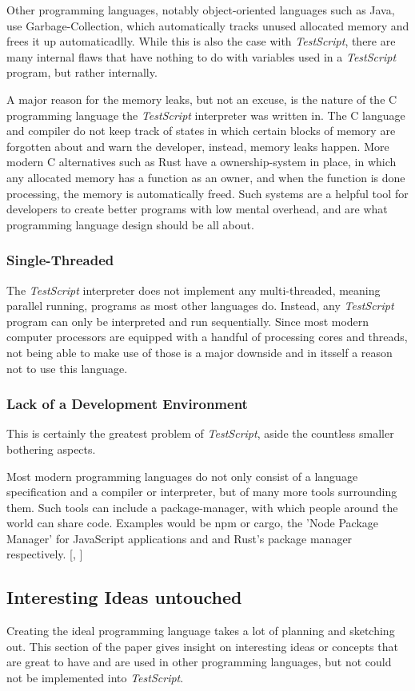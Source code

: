 \documentclass[12pt,a4paper]{article}
\newcommand{\name}{\emph{TestScript}}
\begin{document}
Other programming languages, notably object-oriented languages such as Java,
use Garbage-Collection, which automatically tracks unused allocated memory and
frees it up automaticadlly. While this is also the case with \name{}, there are
many internal flaws that have nothing to do with variables used in a \name{}
program, but rather internally. 

A major reason for the memory leaks, but not an excuse, is the nature of the
C programming language the \name{} interpreter was written in. The C language and
compiler do not keep track of states in which certain blocks of memory are
forgotten about and warn the developer, instead, memory leaks happen.
More modern C alternatives such as Rust have a ownership-system in place,
in which any allocated memory has a function as an owner, and when the function
is done processing, the memory is automatically freed. Such systems are a
helpful tool for developers to create better programs with low mental overhead,
and are what programming language design should be all about.

\subsubsection{Single-Threaded}
The \name{} interpreter does not implement any multi-threaded, meaning parallel
running, programs as most other languages do. Instead, any \name{} program can
only be interpreted and run sequentially. Since most modern computer processors
are equipped with a handful of processing cores and threads, not being able to
make use of those is a major downside and in itsself a reason not to use this
language.

\subsubsection{Lack of a Development Environment}
This is certainly the greatest problem of \name{}, aside the countless smaller
bothering aspects.

Most modern programming languages do not only consist
of a language specification and a compiler or interpreter, but of many more
tools surrounding them.
Such tools can include a package-manager, with which people around the world
can share code. Examples would be npm or cargo, 
the 'Node Package Manager' for JavaScript applications and and Rust's package 
manager respectively.
[, ]

\subsection{Interesting Ideas untouched}
Creating the ideal programming language takes a lot of planning and sketching
out. This section of the paper gives insight on interesting ideas or concepts
that are great to have and are used in other programming languages, but not 
could not be implemented into \name{}.
\end{document}
